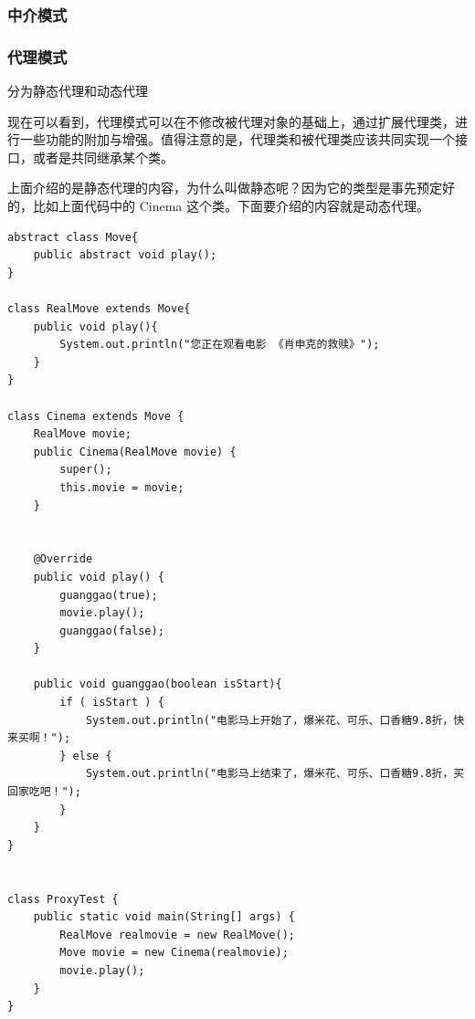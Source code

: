 \documentclass[UTF8]{ctexart}
\begin{document}
\subsubsection{中介模式}



\subsubsection{代理模式}

分为静态代理和动态代理

现在可以看到，代理模式可以在不修改被代理对象的基础上，通过扩展代理类，进行一些功能的附加与增强。值得注意的是，代理类和被代理类应该共同实现一个接口，或者是共同继承某个类。

上面介绍的是静态代理的内容，为什么叫做静态呢？因为它的类型是事先预定好的，比如上面代码中的 Cinema 这个类。下面要介绍的内容就是动态代理。

\begin{lstlisting}
abstract class Move{
	public abstract void play();
}

class RealMove extends Move{
	public void play(){
		System.out.println("您正在观看电影 《肖申克的救赎》");
	}
}

class Cinema extends Move {
	RealMove movie;
	public Cinema(RealMove movie) {
		super();
		this.movie = movie;
	}
	
	
	@Override
	public void play() {
		guanggao(true);
		movie.play();
		guanggao(false);
	}
	
	public void guanggao(boolean isStart){
		if ( isStart ) {
			System.out.println("电影马上开始了，爆米花、可乐、口香糖9.8折，快来买啊！");
		} else {
			System.out.println("电影马上结束了，爆米花、可乐、口香糖9.8折，买回家吃吧！");
		}
	}
}


class ProxyTest {
	public static void main(String[] args) {
		RealMove realmovie = new RealMove();
		Move movie = new Cinema(realmovie);
		movie.play();
	}
}
\end{lstlisting}
\end{document}
